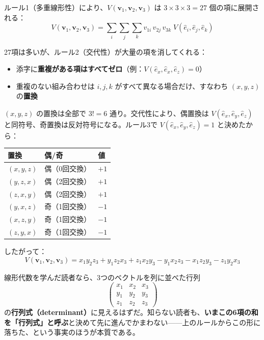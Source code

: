 \documentclass[a4paper,12pt,openany]{book}
\begin{document}
ルール1（多重線形性）により、\(V(\mathbf{v}_1, \mathbf{v}_2, \mathbf{v}_3)\)
は \(3 \times 3 \times 3 = 27\) 個の項に展開される：
\[V(\mathbf{v}_1, \mathbf{v}_2, \mathbf{v}_3) = \sum_i\sum_j\sum_k v_{1i}\,v_{2j}\,v_{3k}\; V(\hat{e}_i, \hat{e}_j, \hat{e}_k)\]

27項は多いが、ルール2（交代性）が大量の項を消してくれる：

\begin{itemize}
\item
  添字に\textbf{重複がある項はすべてゼロ}（例：\(V(\hat{e}_x, \hat{e}_x, \hat{e}_z) = 0\)）
\item
  重複のない組み合わせは \(i, j, k\) がすべて異なる場合だけ、すなわち
  \((x,y,z)\) の\textbf{置換}
\end{itemize}

\((x, y, z)\) の置換は全部で \(3! = 6\) 通り。交代性により、偶置換は
\(V(\hat{e}_x, \hat{e}_y, \hat{e}_z)\)
と同符号、奇置換は反対符号になる。ルール3で
\(V(\hat{e}_x, \hat{e}_y, \hat{e}_z) = 1\) と決めたから：

\begin{longtable}[]{@{}lll@{}}
\toprule\noalign{}
置換 & 偶/奇 & 値 \\
\midrule\noalign{}
\endhead
\bottomrule\noalign{}
\endlastfoot
\((x,y,z)\) & 偶（0回交換） & \(+1\) \\
\((y,z,x)\) & 偶（2回交換） & \(+1\) \\
\((z,x,y)\) & 偶（2回交換） & \(+1\) \\
\((y,x,z)\) & 奇（1回交換） & \(-1\) \\
\((x,z,y)\) & 奇（1回交換） & \(-1\) \\
\((z,y,x)\) & 奇（1回交換） & \(-1\) \\
\end{longtable}

したがって：
\[V(\mathbf{v}_1, \mathbf{v}_2, \mathbf{v}_3) = x_1 y_2 z_3 + y_1 z_2 x_3 + z_1 x_2 y_3 - y_1 x_2 z_3 - x_1 z_2 y_3 - z_1 y_2 x_3\]

線形代数を学んだ読者なら、3つのベクトルを列に並べた行列
\[\begin{pmatrix} x_1 & x_2 & x_3 \\ y_1 & y_2 & y_3 \\ z_1 & z_2 & z_3 \end{pmatrix}\]
の\textbf{行列式（determinant）}に見えるはずだ。知らない読者も、\textbf{いまこの6項の和を「行列式」と呼ぶ}と決めて先に進んでかまわない——上のルールからこの形に落ちた、という事実のほうが本質である。
\end{document}
